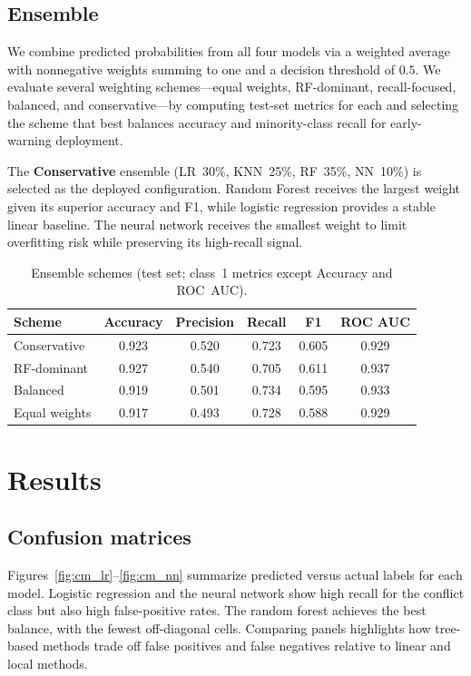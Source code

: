 \documentclass[11pt,a4paper]{article}
\begin{document}
\subsection{Ensemble}
We combine predicted probabilities from all four models via a weighted average with nonnegative weights summing to one and a decision threshold of $0.5$. We evaluate several weighting schemes---equal weights, RF-dominant, recall-focused, balanced, and conservative---by computing test-set metrics for each and selecting the scheme that best balances accuracy and minority-class recall for early-warning deployment.

The \textbf{Conservative} ensemble (LR~30\%, KNN~25\%, RF~35\%, NN~10\%) is selected as the deployed configuration. Random Forest receives the largest weight given its superior accuracy and F1, while logistic regression provides a stable linear baseline. The neural network receives the smallest weight to limit overfitting risk while preserving its high-recall signal.

\begin{table}[H]
  \centering
  \small
  \caption{Ensemble schemes (test set; class~1 metrics except Accuracy and ROC~AUC).}
  \label{tab:ensemble}
  \begin{tabular}{lccccc}
    \toprule
    Scheme & Accuracy & Precision & Recall & F1 & ROC AUC \\
    \midrule
    Conservative & 0.923 & 0.520 & 0.723 & 0.605 & 0.929 \\
    RF-dominant & 0.927 & 0.540 & 0.705 & 0.611 & 0.937 \\
    Balanced & 0.919 & 0.501 & 0.734 & 0.595 & 0.933 \\
    Equal weights & 0.917 & 0.493 & 0.728 & 0.588 & 0.929 \\
    \bottomrule
  \end{tabular}
\end{table}

\section{Results}

\subsection{Confusion matrices}
Figures~\ref{fig:cm_lr}--\ref{fig:cm_nn} summarize predicted versus actual labels for each model. Logistic regression and the neural network show high recall for the conflict class but also high false-positive rates. The random forest achieves the best balance, with the fewest off-diagonal cells. Comparing panels highlights how tree-based methods trade off false positives and false negatives relative to linear and local methods.
\end{document}
